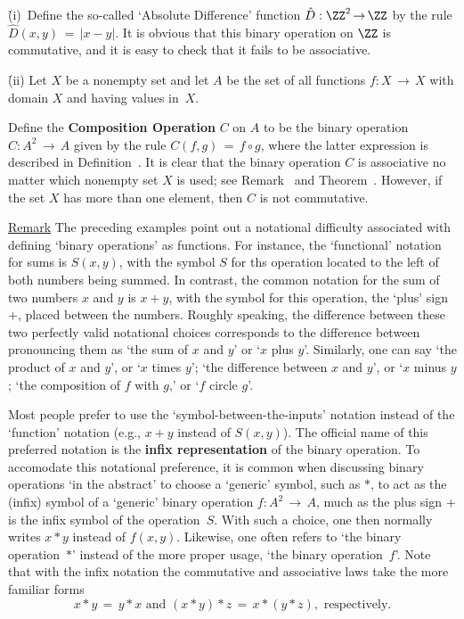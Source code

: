 \VA

        \h (i)\, Define the so-called `Absolute Difference' function $\hat{D}:{\ZZ}^{2} \,{\rightarrow}\, {\ZZ}$ by the rule $\hat{D}(x,y) \,=\, |x-y|$.
    It is obvious that this binary operation on ${\ZZ}$ is commutative, and it is easy to check that it fails to be associative.


        \h (ii) Let $X$ be a nonempty set and let $A$ be the set of all functions $f:X \,{\rightarrow}\, X$ with domain $X$ and having values in~$X$.

\VA

\noindent Define the {\bf Composition Operation} $C$ on $A$ to be the binary operation $C:A^{2} \,{\rightarrow}\, A$
    given by the rule $C(f,g) \,=\, f{\circ}g$, where the latter expression is described in Definition~.
    It is clear that the binary operation $C$ is associative no matter which nonempty set $X$ is used;
    see Remark~ and Theorem~. However, if the set $X$ has more than one element, then $C$ is not commutative.

\VV

        \underline{Remark} The preceding examples point out a notational difficulty associated with defining `binary operations' as functions.
    For instance, the `functional' notation for sums is $S(x,y)$, with the symbol $S$ for ths operation located to the left of both numbers being summed.
    In contrast, the common notation for the sum of two numbers $x$ and $y$ is $x+y$,
    with the symbol for this operation, the `plus' sign $+$, placed between the numbers.
    Roughly speaking, the difference between these two perfectly valid notational choices corresponds to the difference between pronouncing them
    as `the sum of $x$ and $y$' or `$x$ plus $y$'.
    Similarly, one can say `the product of $x$ and $y$', or `$x$ times $y$'; `the difference between $x$ and $y$', or `$x$ minus $y$;
    `the composition of $f$ with $g$,' or `$f$ circle $g$'.

        Most people prefer to use the `symbol-between-the-inputs' notation instead of the `function' notation (e.g., $x+y$ instead of $S(x,y)$).
    The official name of this preferred notation is the
    {\bf infix representation} of the binary operation.
    To accomodate this notational preference, it is common when discussing binary operations `in the abstract' to choose a `generic' symbol,
    such as ${\ast}$, to act as the (infix) symbol of a `generic' binary operation $f:A^{2} \,{\rightarrow}\, A$,
    much as the plus sign $+$ is the infix symbol of the operation~$S$.
    With such a choice, one then normally writes $x{\ast}y$ instead of $f(x,y)$. 
    Likewise, one often refers to `the binary operation~${\ast}$' instead of the more proper usage, `the binary operation~$f$'.
    Note that with the infix notation the commutative and associative laws take the more familiar forms
        \begin{displaymath}
        x{\ast}y \,=\, y{\ast}x \mbox{ and } (x{\ast}y){\ast}z \,=\, x{\ast}(y{\ast}z), \mbox{ respectively}.
        \end{displaymath}


